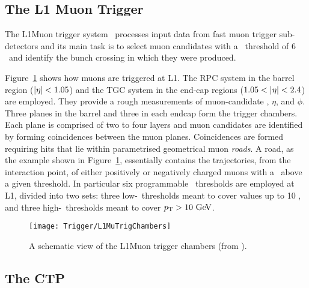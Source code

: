 		\subsection*{The L1 Muon Trigger}

			The \ac{L1Muon} trigger system~\cite{ATLASPerf08} processes input data from fast muon trigger sub-detectors and its main task is to select muon candidates with a \pt\ threshold of 6 \GeV\ and identify the bunch crossing in which they were produced.

			Figure~\ref{fig:L1MuTrig} shows how muons are triggered at \ac{L1}. The \ac{RPC} system in the barrel region ($|\eta| < 1.05$) and the \ac{TGC} system in the end-cap regions ($1.05 < |\eta| < 2.4$) are employed. They provide a rough measurements of muon-candidate \pt, $\eta$, and $\phi$. Three planes in the barrel and three in each endcap form the trigger chambers. Each plane is comprised of two to four layers and muon candidates are identified by forming coincidences between the muon planes. Coincidences are formed requiring hits that lie within parametrised geometrical muon \emph{roads}. A road, as the example shown in Figure~\ref{fig:L1MuTrig}, essentially contains the trajectories, from the interaction point, of either positively or negatively charged muons with a \pt\ above a given threshold. In particular six programmable \pt\ thresholds are employed at \ac{L1}, divided into two sets: three low-\pt\ thresholds meant to cover values up to 10 \GeV, and three high-\pt\ thresholds meant to cover $\pt > 10 \GeV$.

			\begin{figure}[!htb]
				\centering
				\texttt{[image: Trigger/L1MuTrigChambers]}
				\caption{\label{fig:L1MuTrig} A schematic view of the \ac{L1Muon} trigger chambers (from \cite{ATLASTrigger2010}).}
			\end{figure}


		\subsection*{The CTP}

